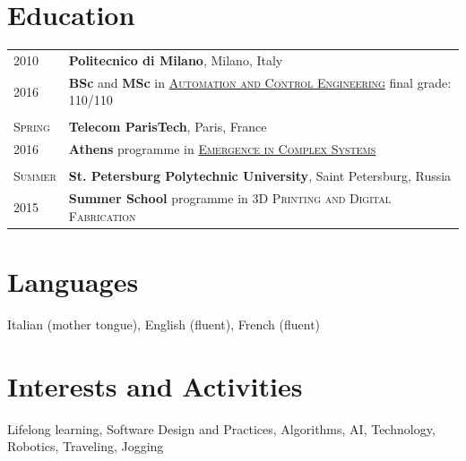 \documentclass[a4paper,10pt]{article}
\begin{document}
	\section{Education}
		\begin{tabular}{p{1.7cm}|p{15.5cm}}
			\centering\textsc{2010} & \textbf{Politecnico di Milano}, Milano, Italy\\
			\centering\textsc{2016} & \textbf{BSc} and \textbf{MSc} in \textsc{\href{http://www.polinternational.polimi.it/educational-offer/laurea-magistrale-equivalent-to-master-of-science-programmes/automation-and-control-engineering/}{Automation and Control Engineering}} \hfill final grade: \textsc{110/110} \\ 
			
			\multicolumn{2}{c}{} \\
			\centering\textsc{Spring} & \textbf{Telecom ParisTech}, Paris, France\\
			\centering\textsc{2016}   &  \textbf{Athens} programme in \textsc{\href{http://www.athensprogramme.com/catalog/show/1640}{Emergence in Complex Systems}}\\
			
			\multicolumn{2}{c}{} \\
			\centering\textsc{Summer} & \textbf{St. Petersburg Polytechnic University}, Saint Petersburg, Russia\\
			\centering\textsc{2015}      & \textbf{Summer School} programme in \textsc{3D Printing and Digital Fabrication}\\
		\end{tabular}

	\section{Languages}
	Italian (mother tongue), English (fluent), French (fluent)

	\section{Interests and Activities}
	Lifelong learning, Software Design and Practices, Algorithms, AI, Technology, Robotics, Traveling, Jogging\\
\end{document}
